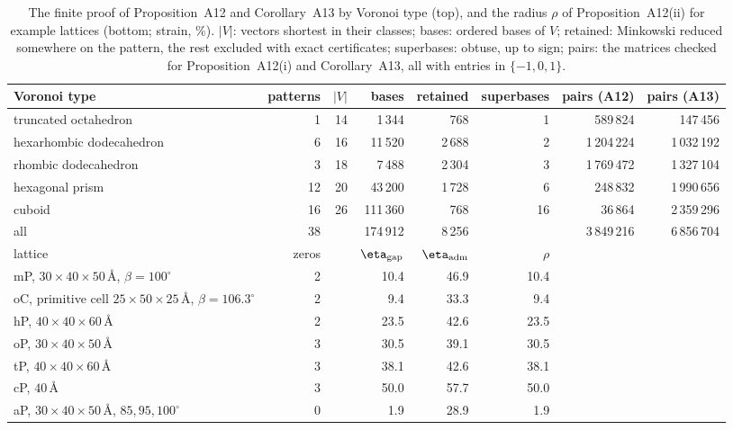 \documentclass[preprint,pdf]{iucr}          %
\begin{document}
\begin{table}
\caption{The finite proof of Proposition~A12 and Corollary~A13 by Voronoi type (top), and the radius $\rho$ of Proposition~A12(ii) for example lattices (bottom; strain, \%). $|V|$: vectors shortest in their classes; bases: ordered bases of $V$; retained: Minkowski reduced somewhere on the pattern, the rest excluded with exact certificates; superbases: obtuse, up to sign; pairs: the matrices checked for Proposition~A12(i) and Corollary~A13, all with entries in $\{-1,0,1\}$.}
\label{tab:niggli}
\begin{footnotesize}
\begin{tabular}{lrrrrrrr}
\toprule
Voronoi type & patterns & $|V|$ & bases & retained & superbases & pairs (A12) & pairs (A13) \\
\midrule
truncated octahedron & 1 & 14 & 1\,344 & 768 & 1 & 589\,824 & 147\,456 \\
hexarhombic dodecahedron & 6 & 16 & 11\,520 & 2\,688 & 2 & 1\,204\,224 & 1\,032\,192 \\
rhombic dodecahedron & 3 & 18 & 7\,488 & 2\,304 & 3 & 1\,769\,472 & 1\,327\,104 \\
hexagonal prism & 12 & 20 & 43\,200 & 1\,728 & 6 & 248\,832 & 1\,990\,656 \\
cuboid & 16 & 26 & 111\,360 & 768 & 16 & 36\,864 & 2\,359\,296 \\
all & 38 & & 174\,912 & 8\,256 & & 3\,849\,216 & 6\,856\,704 \\
\midrule
lattice & zeros & & $\eta_{\rm gap}$ & $\eta_{\rm adm}$ & $\rho$ & & \\
\midrule
mP, $30\times40\times50$\,\AA, $\beta=100^\circ$ & 2 & & 10.4 & 46.9 & 10.4 & & \\
oC, primitive cell $25\times50\times25$\,\AA, $\beta=106.3^\circ$ & 2 & & 9.4 & 33.3 & 9.4 & & \\
hP, $40\times40\times60$\,\AA & 2 & & 23.5 & 42.6 & 23.5 & & \\
oP, $30\times40\times50$\,\AA & 3 & & 30.5 & 39.1 & 30.5 & & \\
tP, $40\times40\times60$\,\AA & 3 & & 38.1 & 42.6 & 38.1 & & \\
cP, $40$\,\AA & 3 & & 50.0 & 57.7 & 50.0 & & \\
aP, $30\times40\times50$\,\AA, $85,95,100^\circ$ & 0 & & 1.9 & 28.9 & 1.9 & & \\
\bottomrule
\end{tabular}
\end{footnotesize}
\end{table}
\end{document}
